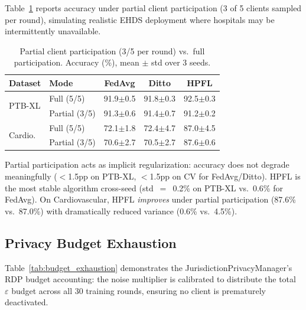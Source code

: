 \documentclass[conference]{IEEEtran}
\begin{document}
Table~\ref{tab:partial_participation} reports accuracy under partial client participation (3 of 5 clients sampled per round), simulating realistic EHDS deployment where hospitals may be intermittently unavailable.

\begin{table}[htbp]
\centering
\caption{Partial client participation (3/5 per round) vs.\ full participation. Accuracy (\%), mean $\pm$ std over 3 seeds.}
\label{tab:partial_participation}
\small
\begin{tabular}{llccc}
\toprule
\textbf{Dataset} & \textbf{Mode} & \textbf{FedAvg} & \textbf{Ditto} & \textbf{HPFL} \\
\midrule
\multirow{2}{*}{PTB-XL} & Full (5/5) & 91.9$\pm$0.5 & 91.8$\pm$0.3 & 92.5$\pm$0.3 \\
 & Partial (3/5) & 91.3$\pm$0.6 & 91.4$\pm$0.7 & 91.2$\pm$0.2 \\
\midrule
\multirow{2}{*}{Cardio.} & Full (5/5) & 72.1$\pm$1.8 & 72.4$\pm$4.7 & 87.0$\pm$4.5 \\
 & Partial (3/5) & 70.6$\pm$2.7 & 70.5$\pm$2.7 & 87.6$\pm$0.6 \\
\bottomrule
\end{tabular}

\vspace{1mm}
\footnotesize{Partial participation acts as implicit regularization: accuracy does not degrade meaningfully ($<$1.5pp on PTB-XL, $<$1.5pp on CV for FedAvg/Ditto). HPFL is the most stable algorithm cross-seed (std~$=$~0.2\% on PTB-XL vs.\ 0.6\% for FedAvg). On Cardiovascular, HPFL \textit{improves} under partial participation (87.6\% vs.\ 87.0\%) with dramatically reduced variance (0.6\% vs.\ 4.5\%).}
\end{table}

\subsection{Privacy Budget Exhaustion}
\label{sec:budget_exhaustion}

Table~\ref{tab:budget_exhaustion} demonstrates the JurisdictionPrivacyManager's RDP budget accounting: the noise multiplier is calibrated to distribute the total $\varepsilon$ budget across all 30 training rounds, ensuring no client is prematurely deactivated.
\end{document}
